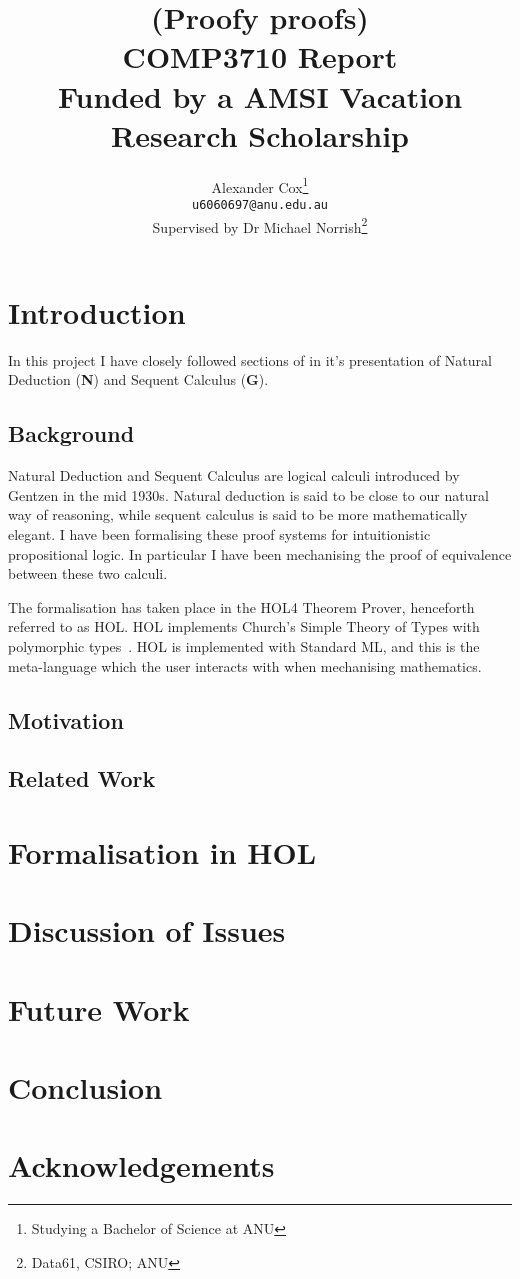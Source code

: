\documentclass[a4paper]{article}
\title{(Proofy proofs)\\
  \normalsize{} COMP3710 Report\\
  Funded by a AMSI Vacation Research Scholarship}
\author{Alexander Cox\thanks{Studying a Bachelor of Science at ANU}\\
      \small\texttt{u6060697@anu.edu.au}\\
      \normalsize{}Supervised by Dr Michael Norrish\thanks{Data61, CSIRO; ANU}}
\newcommand{\N}{\textbf{N}}
\newcommand{\G}{\textbf{G}}
\theoremstyle{definition}
\theoremstyle{remark}
\begin{document}
\maketitle

\begin{abstract}
\end{abstract}

\section{Introduction}
In this project I have closely followed sections of \textcite{bpt} in it's presentation of Natural Deduction (\N) and Sequent Calculus (\G).
\subsection{Background}
Natural Deduction and Sequent Calculus are logical calculi introduced by Gentzen in the mid 1930s. Natural deduction is said to be close to our natural way of reasoning, while sequent calculus is said to be more mathematically elegant. I have been formalising these proof systems for intuitionistic propositional logic. In particular I have been mechanising the proof of equivalence between these two calculi.

The formalisation has taken place in the HOL4 Theorem Prover, henceforth referred to as HOL. HOL implements Church's Simple Theory of Types with polymorphic types~\autocite{HOLbrief}. HOL is implemented with Standard ML, and this is the meta-language which the user interacts with when mechanising mathematics.

\subsection{Motivation}

\subsection{Related Work}
\section{Formalisation in HOL}
\section{Discussion of Issues} %
\section{Future Work}
\section{Conclusion}
\section*{Acknowledgements}
\printbibliography{}
\end{document}
